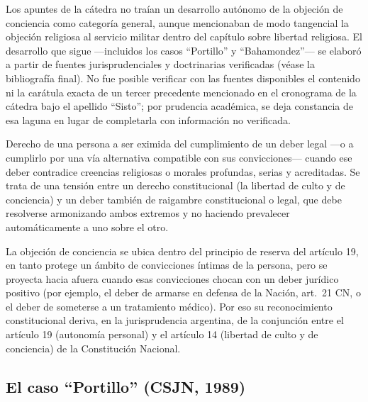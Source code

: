 \documentclass[12pt,oneside]{book}
\begin{document}
\begin{notebox}
Los apuntes de la cátedra no traían un desarrollo autónomo de la objeción de
conciencia como categoría general, aunque mencionaban de modo tangencial la
objeción religiosa al servicio militar dentro del capítulo sobre libertad
religiosa. El desarrollo que sigue —incluidos los casos ``Portillo'' y
``Bahamondez''— se elaboró a partir de fuentes jurisprudenciales y doctrinarias
verificadas (véase la bibliografía final). No fue posible verificar con las
fuentes disponibles el contenido ni la carátula exacta de un tercer precedente
mencionado en el cronograma de la cátedra bajo el apellido ``Sisto''; por
prudencia académica, se deja constancia de esa laguna en lugar de completarla con
información no verificada.
\end{notebox}

\begin{defbox}
Derecho de una persona a ser eximida del cumplimiento de un deber legal —o a
cumplirlo por una vía alternativa compatible con sus convicciones— cuando ese
deber contradice creencias religiosas o morales profundas, serias y acreditadas.
Se trata de una tensión entre un derecho constitucional (la libertad de culto y
de conciencia) y un deber también de raigambre constitucional o legal, que debe
resolverse armonizando ambos extremos y no haciendo prevalecer automáticamente a
uno sobre el otro.
\end{defbox}

La objeción de conciencia se ubica dentro del principio de reserva del artículo
19, en tanto protege un ámbito de convicciones íntimas de la persona, pero se
proyecta hacia afuera cuando esas convicciones chocan con un deber jurídico
positivo (por ejemplo, el deber de armarse en defensa de la Nación, art.\ 21 CN,
o el deber de someterse a un tratamiento médico). Por eso su reconocimiento
constitucional deriva, en la jurisprudencia argentina, de la conjunción entre el
artículo 19 (autonomía personal) y el artículo 14 (libertad de culto y de
conciencia) de la Constitución Nacional.

\subsection{El caso ``Portillo'' (CSJN, 1989)}
\end{document}

